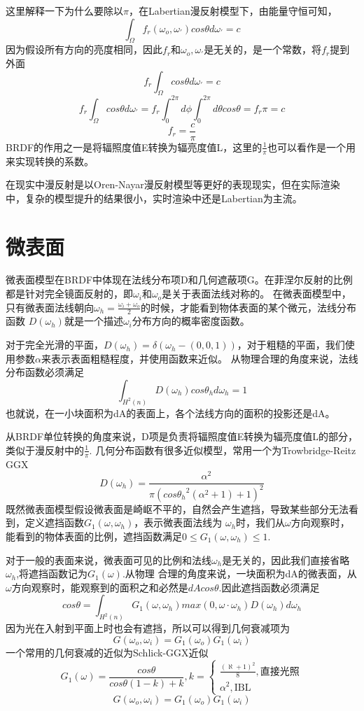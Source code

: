 这里解释一下为什么要除以$\pi$，在Labertian漫反射模型下，由能量守恒可知，
$$
\int_{\Omega}f_{r}({\omega}_{o},{\omega}_{'})cos{\theta}d{\omega}_{'}=c
$$
因为假设所有方向的亮度相同，因此$f_{r}$和${\omega}_{o},{\omega}_{'}$是无关的，是一个常数，将$f_{r}$提到外面
$$
f_{r}\int_{\Omega}cos{\theta}d{\omega}_{'}=c
$$
$$
f_{r}\int_{\Omega}cos{\theta}d{\omega}_{'}=f_{r}\int_{0}^{2\pi}d\phi\int_{0}^{2\pi}d{\theta}cos{\theta}=f_{r}\pi=c
$$
$$
f_{r}=\frac{c}{\pi}
$$
BRDF的作用之一是将辐照度值E转换为辐亮度值L，这里的$\frac{1}{\pi}$也可以看作是一个用来实现转换的系数。

在现实中漫反射是以Oren-Nayar漫反射模型等更好的表现现实，但在实际渲染中，复杂的模型提升的结果很小，实时渲染中还是Labertian为主流。

\section{微表面}
微表面模型在BRDF中体现在法线分布项D和几何遮蔽项G。在菲涅尔反射的比例都是针对完全镜面反射的，即${\omega}_{i}$和${\omega}_{o}$是关于表面法线对称的。
在微表面模型中，只有微表面法线朝向${\omega}_{h}=\frac{{\omega}_{i}+{\omega}_{o}}{2}$的时候，才能看到物体表面的某个微元，法线分布函数
$D({\omega}_{h})$就是一个描述${\omega}_{i}$分布方向的概率密度函数。

对于完全光滑的平面，$D({\omega}_{h})={\delta}({\omega}_{h}-(0,0,1))$，对于粗糙的平面，我们使用参数$\alpha$来表示表面粗糙程度，并使用函数来近似。
从物理合理的角度来说，法线分布函数必须满足
$$
\int_{H^2(n)}D({\omega}_{h})cos{\theta}_{h}d{\omega}_{h}=1
$$
也就说，在一小块面积为dA的表面上，各个法线方向的面积的投影还是dA。

从BRDF单位转换的角度来说，D项是负责将辐照度值E转换为辐亮度值L的部分，类似于漫反射中的$\frac{1}{\pi}$.
几何分布函数有很多近似模型，常用一个为Trowbridge-Reitz GGX
$$
D({\omega}_{h})=\frac{{\alpha}^2}{\pi(cos{\theta_{h}}^2({\alpha}^2+1)+1)^2}
$$
既然微表面模型假设微表面是崎岖不平的，自然会产生遮挡，导致某些部分无法看到，定义遮挡函数$G_{1}(\omega,{\omega}_{h})$，表示微表面法线为
${\omega}_{h}$时，我们从$\omega$方向观察时，能看到的物体表面的比例，遮挡函数满足$0 \leq G_{1}(\omega, {\omega}_{h}) \leq 1$.

对于一般的表面来说，微表面可见的比例和法线${\omega}_{h}$是无关的，因此我们直接省略${\omega}_{h}$,将遮挡函数记为$G_{1}(\omega)$.从物理
合理的角度来说，一块面积为dA的微表面，从$\omega$方向观察时，能观察到的面积之和必然是$dAcos{\theta}$.因此遮挡函数必须满足
$$
cos{\theta}=\int_{H^2(n)}G_{1}(\omega,{\omega}_{h})max(0, \omega \cdot {\omega}_{h})D({\omega}_{h})d{\omega}_{h}
$$
因为光在入射到平面上时也会有遮挡，所以可以得到几何衰减项为
$$
G({\omega}_{o},{\omega}_{i})=G_{1}({\omega}_{o})G_{1}({\omega}_{i})
$$
一个常用的几何衰减的近似为Schlick-GGX近似
$$
G_{1}(\omega)=\frac{cos{\theta}}{cos{\theta}(1-k)+k}, k= \left \{ \begin{array}{lr} \frac{(\aleph+1)^2}{8}, \text{直接光照} \\ {\alpha}^2 , \text{IBL} \end{array} \right.
$$
$$
G({\omega}_{o},{\omega}_{i})=G_{1}({\omega}_{o})G_{1}({\omega}_{i})
$$

